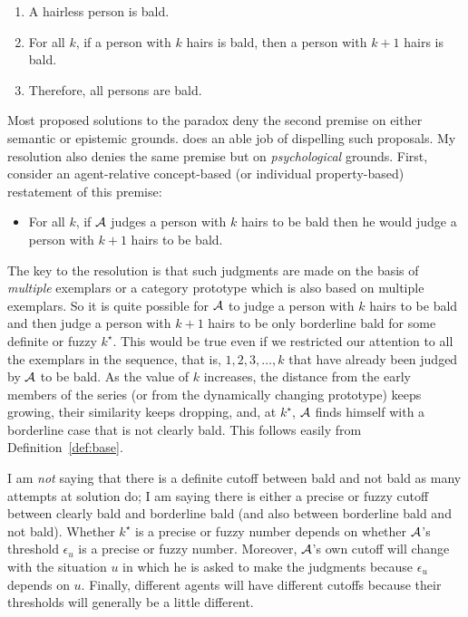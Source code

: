 \begin{enumerate}

\item A hairless person is bald.

\item For all $k$, if a person with $k$ hairs is bald, then a person with $k + 1$ hairs is bald.

\item Therefore, all persons are bald.

\end{enumerate}

Most proposed solutions to the paradox deny the second premise on either semantic or epistemic grounds. \citet[Chapter~5]{schiffer:tm} does an able job of dispelling such proposals. My resolution also denies the same premise but on \emph{psychological} grounds. First, consider an agent-relative concept-based (or individual property-based) restatement of this premise:

\begin{itemize}

\item For all $k$, if $\cal A$ judges a person with $k$ hairs to be bald then he would judge a person with $k + 1$ hairs to be bald.

\end{itemize}

The key to the resolution is that such judgments are made on the basis of \emph{multiple} exemplars or a category prototype which is also based on multiple exemplars. So it is quite possible for $\cal A$ to judge a person with $k$ hairs to be bald and then judge a person with $k + 1$ hairs to be only borderline bald for some definite or fuzzy $k^\star$. This would be true even if we restricted our attention to all the exemplars in the sequence, that is, $1, 2, 3, \ldots, k$ that have already been judged by $\cal A$ to be bald. As the value of $k$ increases, the distance from the early members of the series (or from the dynamically changing prototype) keeps growing, their similarity keeps dropping, and, at $k^\star$, $\cal A$ finds himself with a borderline case that is not clearly bald. This follows easily from Definition~\ref{def:base}.

I am \emph{not} saying that there is a definite cutoff between bald and not bald as many attempts at solution do; I am saying there is either a precise or fuzzy cutoff between clearly bald and borderline bald (and also between borderline bald and not bald). Whether $k^\star$ is a precise or fuzzy number depends on whether $\cal A$'s threshold $\epsilon_u$ is a precise or fuzzy number. Moreover, $\cal A$'s own cutoff will change with the situation $u$ in which he is asked to make the judgments because $\epsilon_u$ depends on $u$. Finally, different agents will have different cutoffs because their thresholds will generally be a little different.

